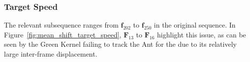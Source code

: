 \subsubsection{Target Speed}\label{mean_shift_target_speed}
The relevant subsequence ranges from $\mathbf{f}_{202}$ to $\mathbf{f}_{250}$
in the original sequence.
In Figure~\ref{fig:mean_shift_target_speed}, $\mathbf{F}_{13}$ to $\mathbf{F}_{16}$
highlight this issue, as can be seen by the Green Kernel failing to track the
Ant for the due to its relatively large inter-frame displacement.

\begin{figure}
\end{figure}
